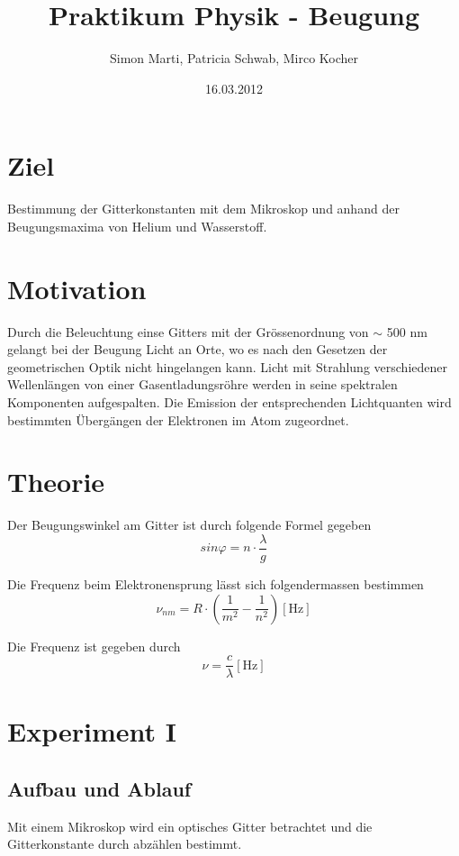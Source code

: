 \documentclass[12pt,a4paper]{article}
\title{Praktikum Physik - Beugung}
\author{Simon Marti, Patricia Schwab, Mirco Kocher}
\date{16.03.2012}
\begin{document}
\maketitle

\section*{Ziel}
Bestimmung der Gitterkonstanten mit dem Mikroskop und anhand der Beugungsmaxima von Helium und Wasserstoff.

\section*{Motivation}
Durch die Beleuchtung einse Gitters mit der Gr\"ossenordnung von $\sim$ 500 nm gelangt bei der Beugung Licht an Orte, wo es nach den Gesetzen der geometrischen Optik nicht hingelangen kann. Licht mit Strahlung verschiedener Wellenl\"angen von einer Gasentladungsr\"ohre werden in seine spektralen Komponenten aufgespalten. Die Emission der entsprechenden Lichtquanten wird bestimmten \"Uberg\"angen der Elektronen im Atom zugeordnet.


\section*{Theorie}
Der Beugungswinkel am Gitter ist durch folgende Formel gegeben
\begin{equation}\label{eq:g}
sin\varphi = n\cdot \frac{\lambda}{g}
\end{equation}

Die Frequenz beim Elektronensprung l\"asst sich folgendermassen bestimmen
\begin{equation}\label{eq:e}
\nu_{nm} = R\cdot \left(\frac{1}{m^2}-\frac{1}{n^2}\right) [\mbox{Hz}]
\end{equation}

Die Frequenz ist gegeben durch 
\begin{equation}\label{eq:f}
\nu = \frac{c}{\lambda} [\mbox{Hz}]
\end{equation}

\section*{Experiment I}
\subsection*{Aufbau und Ablauf}
Mit einem Mikroskop wird ein optisches Gitter betrachtet und die Gitterkonstante durch abz\"ahlen bestimmt.
\end{document}
